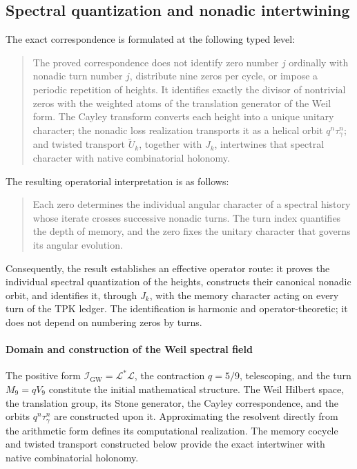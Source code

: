 \subsection{Spectral quantization and nonadic intertwining}
The exact correspondence is formulated at the following typed level:\par
\begin{quote}
The proved correspondence does not identify zero number \(j\) ordinally with nonadic turn number \(j\), distribute nine zeros per cycle, or impose a periodic repetition of heights. It identifies exactly the divisor of nontrivial zeros with the weighted atoms of the translation generator of the Weil form. The Cayley transform converts each height into a unique unitary character; the nonadic loss realization transports it as a helical orbit \(q^n\tau_\gamma^n\); and twisted transport \(\widetilde U_k\), together with \(J_k\), intertwines that spectral character with native combinatorial holonomy.\par
\end{quote}
The resulting operatorial interpretation is as follows:\par
\begin{quote}
Each zero determines the individual angular character of a spectral history whose iterate crosses successive nonadic turns. The turn index quantifies the depth of memory, and the zero fixes the unitary character that governs its angular evolution.\par
\end{quote}
Consequently, the result establishes an effective operator route: it proves the individual spectral quantization of the heights, constructs their canonical nonadic orbit, and identifies it, through \(J_k\), with the memory character acting on every turn of the TPK ledger. The identification is harmonic and operator-theoretic; it does not depend on numbering zeros by turns.\par
\paragraph{Domain and construction of the Weil spectral field}
The positive form \(\mathscr I_{\mathrm{GW}}=\mathscr L^*\mathscr L\), the contraction \(q=5/9\), telescoping, and the turn \(M_9=qV_9\) constitute the initial mathematical structure. The Weil Hilbert space, the translation group, its Stone generator, the Cayley correspondence, and the orbits \(q^n\tau_\gamma^n\) are constructed upon it. Approximating the resolvent directly from the arithmetic form defines its computational realization. The memory cocycle and twisted transport constructed below provide the exact intertwiner with native combinatorial holonomy.

